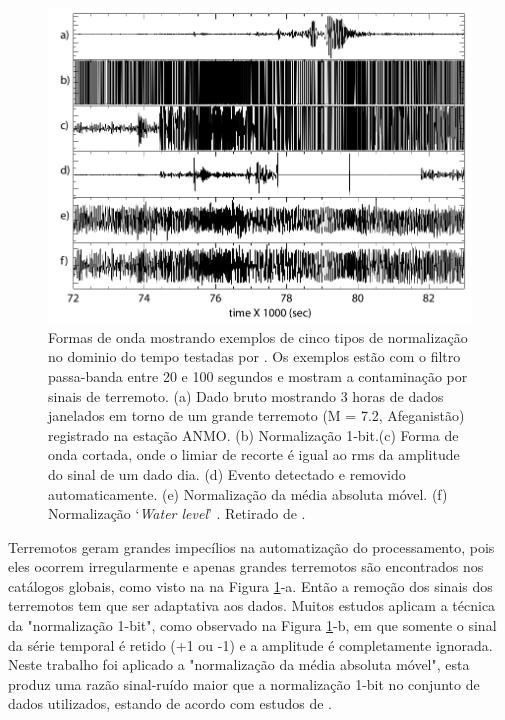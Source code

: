 \begin{figure}[!ht]
\centering
\includegraphics[scale=0.55]{Figs/temporal_norma.png}
\caption[Formas de onda mostrando exemplos de cinco tipos de normalização no dominio do tempo.]{Formas de onda mostrando exemplos de cinco tipos de normalização no dominio do tempo testadas por \cite{bensen_processing_2007}. Os exemplos estão com o filtro passa-banda entre 20 e 100 segundos e mostram a contaminação por sinais de terremoto. (a)  Dado bruto mostrando 3 horas de dados janelados em torno de um grande terremoto (M = 7.2, Afeganistão) registrado na estação ANMO. (b) Normalização 1-bit.(c) Forma de onda cortada, onde o limiar de recorte é igual ao rms da amplitude do sinal de um dado dia. (d) Evento detectado e removido automaticamente. (e) Normalização da média absoluta móvel. (f) Normalização ‘\textit{Water level}’ . Retirado de \cite{bensen_processing_2007}.}
\label{temporal_norma}
\end{figure} 


Terremotos geram grandes impecílios na automatização do processamento, pois eles ocorrem irregularmente e apenas grandes terremotos são encontrados nos catálogos globais, como visto na na Figura \ref{temporal_norma}-a. Então a remoção dos sinais dos terremotos tem que ser adaptativa aos dados. Muitos estudos aplicam a técnica da "normalização 1-bit", como observado na Figura \ref{temporal_norma}-b, em que somente o sinal da série temporal é retido (+1 ou -1) e a amplitude é completamente ignorada. Neste trabalho foi aplicado a "normalização da média absoluta móvel", esta produz uma razão sinal-ruído maior que a normalização 1-bit no conjunto de dados utilizados, estando de acordo com estudos de \cite{seats_improved_2012}.

